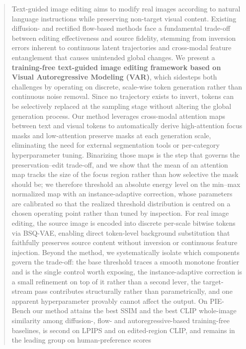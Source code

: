 
\begin{abstract}
Text-guided image editing aims to modify real images according to natural language instructions while preserving non-target visual content. Existing diffusion- and rectified flow-based methods face a fundamental trade-off between editing effectiveness and source fidelity, stemming from inversion errors inherent to continuous latent trajectories and cross-modal feature entanglement that causes unintended global changes. We present a \textbf{training-free text-guided image editing framework based on Visual Autoregressive Modeling (VAR)}, which sidesteps both challenges by operating on discrete, scale-wise token generation rather than continuous noise removal. Since no trajectory exists to invert, tokens can be selectively replaced at the sampling stage without altering the global generation process. Our method leverages cross-modal attention maps between text and visual tokens to automatically derive high-attention focus masks and low-attention preserve masks at each generation scale, eliminating the need for external segmentation tools or per-category hyperparameter tuning. Binarizing those maps is the step that governs the preservation--edit trade-off, and we show that the mean of an attention map tracks the size of the focus region rather than how selective the mask should be; we therefore threshold an absolute energy level on the min--max normalized map with an instance-adaptive correction, whose parameters are calibrated so that the realized threshold distribution is centred on a chosen operating point rather than tuned by inspection. For real image editing, the source image is encoded into discrete per-scale bitwise tokens via BSQ-VAE, enabling direct token-level background substitution that faithfully preserves source content without inversion or continuous feature injection. Beyond the method, we systematically isolate which components govern the trade-off: the base threshold traces a smooth monotone frontier and is the single control worth exposing, the instance-adaptive correction is a small refinement on top of it rather than a second lever, the target-stream pass contributes structurally rather than parametrically, and one apparent hyperparameter provably cannot affect the output. On PIE-Bench our method attains the best SSIM and the best CLIP whole-image similarity among diffusion-, flow- and autoregressive-based training-free baselines, is second on LPIPS and on edited-region CLIP, and remains in the leading group on human-preference scores 
\end{abstract}
